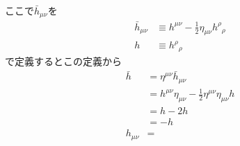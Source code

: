 \documentclass[autodetect-engine,dvi=dvipdfmx,ja=standard, 10pt, a4paper]{bxjsarticle}
\begin{document}
ここで$\bar{h}_{\mu\nu}$を
\begin{align}
	\bar{h}_{\mu\nu}& \equiv h^{\mu\nu} - \frac{1}{2}\eta_{\mu\nu} h^\rho{}_\rho\\
	h &\equiv h^\rho{}_\rho	
\end{align}
で定義するとこの定義から
\begin{align}
	\bar{h} &= \eta^{\mu\nu}\bar{h}_{\mu\nu}\nonumber\\
	&= h^{\mu\nu}\eta_{\mu\nu} - \frac{1}{2}\eta^{\mu\nu}\eta_{\mu\nu} h\nonumber\\
	&= h - 2h\nonumber\\
	&= -h\\
	h_{\mu\nu} &= 
\end{align}
\end{document}
